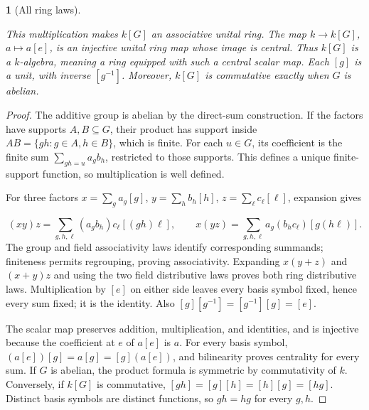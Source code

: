 \documentclass[11pt,a4paper]{article}
\newcommand{\mathheading}{}
\theoremstyle{plain}
\newtheorem*{plainstatement}{\mathheading}
\theoremstyle{definition}
\newenvironment{mathstatement}[3]{\renewcommand{\mathheading}{#1 #2}\begin{plainstatement}[#3]}{\end{plainstatement}}
\begin{document}
\begin{mathstatement}{Theorem}{7.2}{All ring laws}
\label{env-7-2}

This multiplication makes \(k[G]\) an associative unital ring. The map \(k\to k[G]\), \(a\mapsto a[e]\), is an injective unital ring map whose image is central. Thus \(k[G]\) is a \emph{\(k\)-algebra}, meaning a ring equipped with such a central scalar map. Each \([g]\) is a unit, with inverse \([g^{-1}]\). Moreover, \(k[G]\) is commutative exactly when \(G\) is abelian.


\par{}\par

\end{mathstatement}
 
\begin{proof}

The additive group is abelian by the direct-sum construction. If the factors have supports \(A,B\subseteq G\), their product has support inside \(AB=\{gh:g\in A,h\in B\}\), which is finite. For each \(u\in G\), its coefficient is the finite sum \(\sum_{gh=u}a_gb_h\), restricted to those supports. This defines a unique finite-support function, so multiplication is well defined.


For three factors \(x=\sum_g a_g[g]\), \(y=\sum_h b_h[h]\), \(z=\sum_\ell c_\ell[\ell]\), expansion gives

 \[(xy)z=\sum_{g,h,\ell}(a_gb_h)c_\ell[(gh)\ell],\qquad x(yz)=\sum_{g,h,\ell}a_g(b_hc_\ell)[g(h\ell)].\] 
The group and field associativity laws identify corresponding summands; finiteness permits regrouping, proving associativity. Expanding \(x(y+z)\) and \((x+y)z\) and using the two field distributive laws proves both ring distributive laws. Multiplication by \([e]\) on either side leaves every basis symbol fixed, hence every sum fixed; it is the identity. Also \([g][g^{-1}]=[g^{-1}][g]=[e]\).


The scalar map preserves addition, multiplication, and identities, and is injective because the coefficient at \(e\) of \(a[e]\) is \(a\). For every basis symbol, \((a[e])[g]=a[g]=[g](a[e])\), and bilinearity proves centrality for every sum. If \(G\) is abelian, the product formula is symmetric by commutativity of \(k\). Conversely, if \(k[G]\) is commutative, \([gh]=[g][h]=[h][g]=[hg]\). Distinct basis symbols are distinct functions, so \(gh=hg\) for every \(g,h\).


\end{proof}
 
\end{document}
